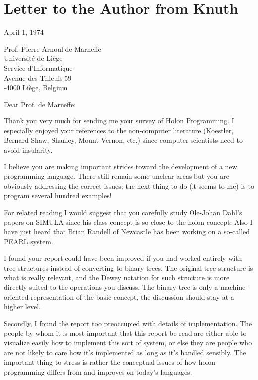 \documentclass[openany,nobib]{tufte-book}
\begin{document}
\mainmatter

\chapter{Letter to the Author from Knuth}
\label{ch:knuth-letter}

\hfill April 1, 1974

\noindent Prof. Pierre-Arnoul de Marneffe\\
\noindent Universit\'e de Li\`ege\\
\noindent Service d'Informatique\\
\noindent Avenue des Tilleuls 59\\
-4000 Li\`ege, Belgium\\

\bigskip

\noindent Dear Prof. de Marneffe:

\medskip

Thank you very much for sending me your survey of Holon Programming. I
especially enjoyed your references to the non-computer literature (Koestler,
Bernard-Shaw, Shanley, Mount Vernon, etc.) since computer scientists need to
avoid insularity.

I believe you are making important strides toward the development of a new
programming language. There still remain some unclear areas but you are
obviously addressing the correct issues; the next thing to do (it seems to me)
is to program  several hundred examples!

For related reading I would suggest that you carefully study Ole-Johan Dahl's
papers on SIMULA since his class concept is so close to the holon concept. Also
I have just heard that Brian Randell of Newcastle has been working on a
so-called PEARL system.

I found your report could have been improved if you had worked entirely with
tree structures instead of converting to binary trees. The original tree
structure is what is really relevant, and the Dewey notation for such structure
is more directly suited to the operations you discuss. The binary tree is only
a machine-oriented representation of the basic concept, the discussion should
stay at a higher level.

Secondly, I found the report too preoccupied with details of implementation.
The people by whom it is most important that this report be read are either
able to visualize easily how to implement this sort of system, or else they are
people who are not likely to care how it's implemented as long as it's handled
sensibly. The important thing to stress is rather the conceptual issues of how
holon programming differs from and improves on today's languages.
\end{document}
